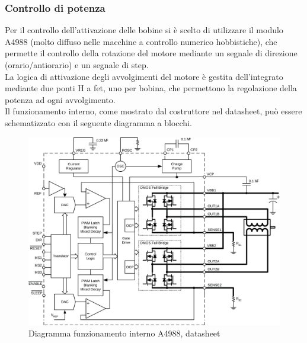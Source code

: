 \documentclass[12pt]{article}
\begin{document}
    
    
        \subsubsection{Controllo di potenza}
        Per il controllo dell'attivazione delle bobine si è scelto di utilizzare il modulo A4988 (molto diffuso nelle macchine a controllo numerico hobbistiche), che permette il controllo della rotazione del motore mediante un segnale di direzione (orario/antiorario) e un segnale di step.\\
        La logica di attivazione degli avvolgimenti del motore è gestita dell'integrato mediante due ponti H a fet, uno per bobina, che permettono la regolazione della potenza ad ogni avvolgimento.\\
        Il funzionamento interno, come mostrato dal costruttore nel datasheet, può essere schematizzato con il seguente diagramma a blocchi.\\
        \begin{figure}[h]
        \centering
            \includegraphics[width=320pt]{Draws/A4988_functional_diagram.png}
            \caption{Diagramma funzionamento interno A4988, datasheet}
            \label{fig:A4988_diagram}
        \end{figure}
        
\end{document}
